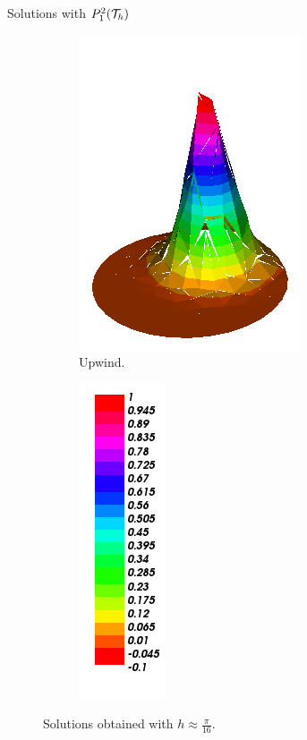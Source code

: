 \begin{frame}{Solutions with $\relax{P}_1^2(\mathcal{T}_h)$}
\begin{figure}[h!]
\begin{subfigure}[b]{0.27\textwidth}
				\centering
				\includegraphics[scale=0.2]{img/Conveccion_Reaccion/Recortes/steady_convect_react_approx_UPW_n_32.png}
				\caption{Upwind.}
			\end{subfigure}
			\begin{subfigure}[b]{0.15\textwidth}
				\centering
				\includegraphics[scale=0.2]{img/Conveccion_Reaccion/Recortes/steady_convect_react_values.png}
			\end{subfigure}
			\caption{Solutions obtained with $h\approx\frac{\pi}{16}$.}
		\end{figure}
		\vspace{-0.7cm}
		\begin{figure}[h!]
			\begin{subfigure}[b]{0.27\textwidth}
				\centering

\end{subfigure}
\end{figure}
\end{frame}
